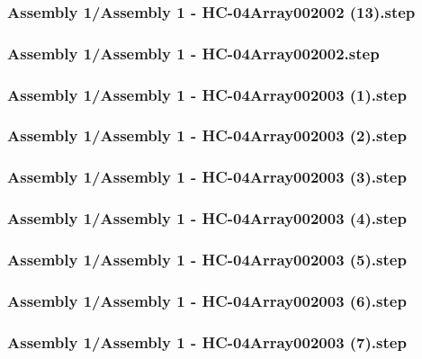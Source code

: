 \documentclass[a4paper,12pt]{article}
\begin{document}
\subsubsection{Assembly 1/Assembly 1 - HC-04Array002002 (13).step}

\subsubsection{Assembly 1/Assembly 1 - HC-04Array002002.step}

\subsubsection{Assembly 1/Assembly 1 - HC-04Array002003 (1).step}

\subsubsection{Assembly 1/Assembly 1 - HC-04Array002003 (2).step}

\subsubsection{Assembly 1/Assembly 1 - HC-04Array002003 (3).step}

\subsubsection{Assembly 1/Assembly 1 - HC-04Array002003 (4).step}

\subsubsection{Assembly 1/Assembly 1 - HC-04Array002003 (5).step}

\subsubsection{Assembly 1/Assembly 1 - HC-04Array002003 (6).step}

\subsubsection{Assembly 1/Assembly 1 - HC-04Array002003 (7).step}

\end{document}
